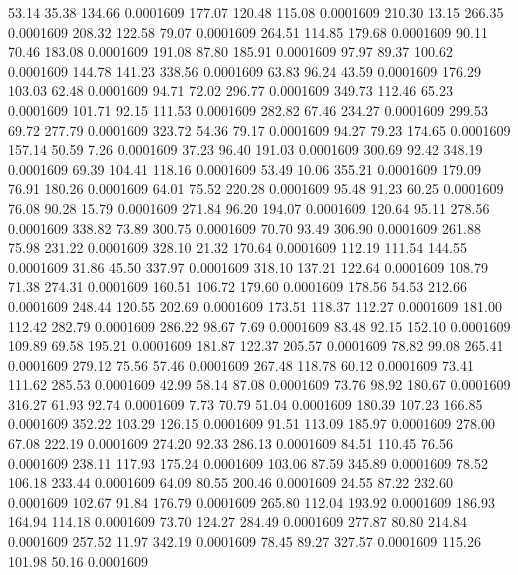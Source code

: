   53.14   35.38  134.66   0.0001609
 177.07  120.48  115.08   0.0001609
 210.30   13.15  266.35   0.0001609
 208.32  122.58   79.07   0.0001609
 264.51  114.85  179.68   0.0001609
  90.11   70.46  183.08   0.0001609
 191.08   87.80  185.91   0.0001609
  97.97   89.37  100.62   0.0001609
 144.78  141.23  338.56   0.0001609
  63.83   96.24   43.59   0.0001609
 176.29  103.03   62.48   0.0001609
  94.71   72.02  296.77   0.0001609
 349.73  112.46   65.23   0.0001609
 101.71   92.15  111.53   0.0001609
 282.82   67.46  234.27   0.0001609
 299.53   69.72  277.79   0.0001609
 323.72   54.36   79.17   0.0001609
  94.27   79.23  174.65   0.0001609
 157.14   50.59    7.26   0.0001609
  37.23   96.40  191.03   0.0001609
 300.69   92.42  348.19   0.0001609
  69.39  104.41  118.16   0.0001609
  53.49   10.06  355.21   0.0001609
 179.09   76.91  180.26   0.0001609
  64.01   75.52  220.28   0.0001609
  95.48   91.23   60.25   0.0001609
  76.08   90.28   15.79   0.0001609
 271.84   96.20  194.07   0.0001609
 120.64   95.11  278.56   0.0001609
 338.82   73.89  300.75   0.0001609
  70.70   93.49  306.90   0.0001609
 261.88   75.98  231.22   0.0001609
 328.10   21.32  170.64   0.0001609
 112.19  111.54  144.55   0.0001609
  31.86   45.50  337.97   0.0001609
 318.10  137.21  122.64   0.0001609
 108.79   71.38  274.31   0.0001609
 160.51  106.72  179.60   0.0001609
 178.56   54.53  212.66   0.0001609
 248.44  120.55  202.69   0.0001609
 173.51  118.37  112.27   0.0001609
 181.00  112.42  282.79   0.0001609
 286.22   98.67    7.69   0.0001609
  83.48   92.15  152.10   0.0001609
 109.89   69.58  195.21   0.0001609
 181.87  122.37  205.57   0.0001609
  78.82   99.08  265.41   0.0001609
 279.12   75.56   57.46   0.0001609
 267.48  118.78   60.12   0.0001609
  73.41  111.62  285.53   0.0001609
  42.99   58.14   87.08   0.0001609
  73.76   98.92  180.67   0.0001609
 316.27   61.93   92.74   0.0001609
   7.73   70.79   51.04   0.0001609
 180.39  107.23  166.85   0.0001609
 352.22  103.29  126.15   0.0001609
  91.51  113.09  185.97   0.0001609
 278.00   67.08  222.19   0.0001609
 274.20   92.33  286.13   0.0001609
  84.51  110.45   76.56   0.0001609
 238.11  117.93  175.24   0.0001609
 103.06   87.59  345.89   0.0001609
  78.52  106.18  233.44   0.0001609
  64.09   80.55  200.46   0.0001609
  24.55   87.22  232.60   0.0001609
 102.67   91.84  176.79   0.0001609
 265.80  112.04  193.92   0.0001609
 186.93  164.94  114.18   0.0001609
  73.70  124.27  284.49   0.0001609
 277.87   80.80  214.84   0.0001609
 257.52   11.97  342.19   0.0001609
  78.45   89.27  327.57   0.0001609
 115.26  101.98   50.16   0.0001609
